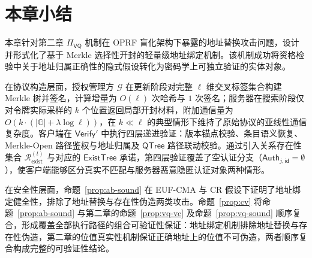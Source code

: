 \section{本章小结}\label{sec:commit-summary}

本章针对第二章 $\Pi_{\mathsf{VQ}}$ 机制在 OPRF 盲化架构下暴露的地址替换攻击问题，设计并形式化了基于 Merkle 选择性开封的轻量级地址绑定机制。该机制成功将资格检验中关于地址归属正确性的隐式假设转化为密码学上可独立验证的实体对象。

在协议构造层面，授权管理方 $\mathcal{G}$ 在更新阶段对完整 $\ell$ 维交叉标签集合构建 Merkle 树并签名，计算增量为 $O(\ell)$ 次哈希与 $1$ 次签名；服务器在搜索阶段仅对令牌实际采样的 $k$ 个位置返回局部开封材料，附加通信量为 $O(k\cdot(|\mathbb{G}|+\lambda\log\ell))$，在 $k\ll\ell$ 的典型情形下维持了原始协议的亚线性通信复杂度。客户端在 $\mathsf{Verify}'$ 中执行四层递进验证：版本锚点校验、条目语义恢复、Merkle-Open 路径鉴权与地址归属及 $\mathsf{QTree}$ 路径联动校验。通过引入关系存在性集合 $\mathcal{R}_{\mathsf{exist}}^{(t)}$ 与对应的 $\mathsf{ExistTree}$ 承诺，第四层验证覆盖了空认证分支（$\mathsf{Auth}_{j,\mathsf{id}}=\emptyset$），使客户端能够区分真实不匹配与服务器恶意隐匿认证对象两种情形。

在安全性层面，命题~\ref{prop:ab-sound} 在 EUF-CMA 与 CR 假设下证明了地址绑定健全性，排除了地址替换与存在性伪造两类攻击。命题~\ref{prop:cv} 将命题~\ref{prop:ab-sound} 与第二章的命题~\ref{prop:vq-vc} 及命题~\ref{prop:vq-sound} 顺序复合，形成覆盖全部执行路径的组合可验证性保证：地址绑定机制排除地址替换与存在性伪造，第二章的位值真实性机制保证正确地址上的位值不可伪造，两者顺序复合构成完整的可验证性结论。
